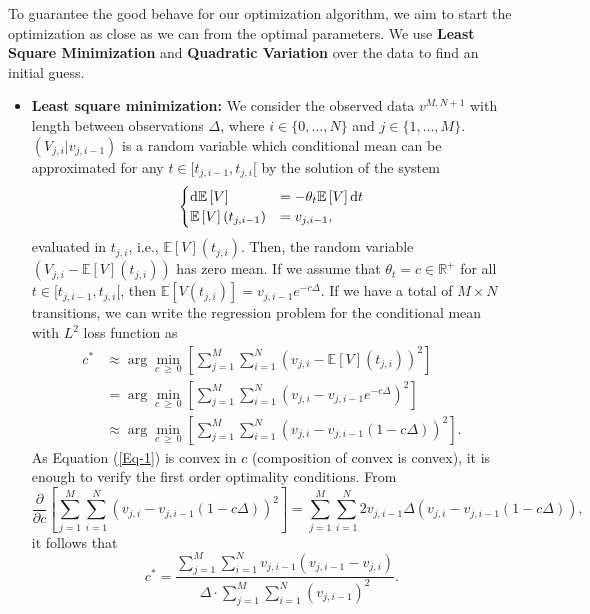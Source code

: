 \documentclass[11pt]{article}
\theoremstyle{definition}
\newcommand{\E}{\mathbb{E}}
\newcommand{\R}{\mathbb{R}}
\begin{document}
To guarantee the good behave for our optimization algorithm, we aim to start the optimization as close as we can from the optimal parameters. We use \textbf{Least Square Minimization} and \textbf{Quadratic Variation} over the data to find an initial guess.

\begin{itemize}

\item \textbf{Least square minimization:} We consider the observed data $v^{M,N+1}$ with length between observations $\Delta$, where $i\in\{0,\dots,N\}$ and $j\in\{1,\dots,M\}$. $(V_{j,i}|v_{j,i-1})$ is a random variable which conditional mean can be approximated for any $t\in [t_{j,i-1}, t_{j, i}[$ by the solution of the system
\begin{equation*}
\begin{cases}
\dif \E\left[V\right]&=-\theta_t\E\left[V\right]\dif t\\
\E\left[V\right](t_{j,i-1})&=v_{j,i-1},
\end{cases}
\end{equation*}
evaluated in $t_{j,i}$, i.e., $\E\left[V\right](t_{j,i})$. Then, the random variable $(V_{j,i}-\E\left[V\right](t_{j,i}))$ has zero mean. If we assume that $\theta_t=c\in\R^+$ for all $t\in[t_{j,i-1},t_{j,i}[$, then $\E\left[V(t_{j,i})\right]=v_{j,i-1}e^{-c\Delta}$. If we have a total of $M\times N$ transitions, we can write the regression problem for the conditional mean with $L^2$ loss function as
\begin{equation}
\begin{split}
c^*&\approx\arg\min_{c\ \geq\ 0}\left[\sum_{j=1}^M\sum_{i=1}^{N}\left(v_{j,i}-\E\left[V\right](t_{j,i})\right)^2\right]\\
&=\arg\min_{c\ \geq\ 0}\left[\sum_{j=1}^M\sum_{i=1}^{N}\left(v_{j,i}-v_{j,i-1}e^{-c\Delta}\right)^2\right]\\
&\approx\arg\min_{c\ \geq\ 0}\left[\sum_{j=1}^M\sum_{i=1}^{N}\left(v_{j,i}-v_{j,i-1}(1-c\Delta)\right)^2\right].
\end{split}
\label{Eq-1}
\end{equation}
As Equation (\ref{Eq-1}) is convex in $c$ (composition of convex is convex), it is enough to verify the first order optimality conditions. From
\begin{equation*}
\frac{\partial}{\partial c}\left[\sum_{j=1}^M\sum_{i=1}^{N}\left(v_{j,i}-v_{j,i-1}(1-c\Delta)\right)^2\right]=\sum_{j=1}^M\sum_{i=1}^{N}2v_{j,i-1}\Delta\left(v_{j,i}-v_{j,i-1}(1-c\Delta)\right),
\end{equation*}
it follows that
\begin{equation}
c^{*}=\frac{\sum_{j=1}^M\sum_{i=1}^{N}v_{j,i-1}(v_{j,i-1}-v_{j,i})}{\Delta\cdot\sum_{j=1}^M\sum_{i=1}^{N}(v_{j,i-1})^2}.
\label{Eq-4}
\end{equation}


\end{itemize}
\end{document}
